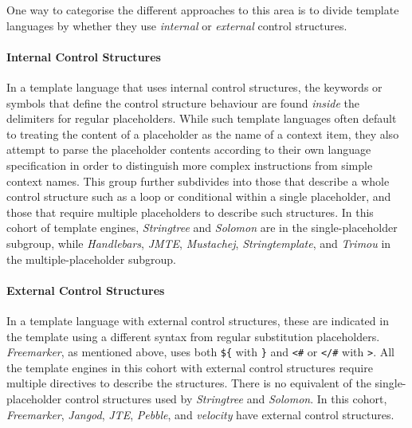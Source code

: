 One way to categorise the different approaches to this area is to divide \gls{template language}s by whether they use \emph{internal} or \emph{external} control structures.

\label{A179}
\paragraph{Internal Control Structures} In a \gls{template language} that uses internal control structures, the keywords or symbols that define the control structure behaviour are found \emph{inside} the delimiters for regular placeholders. While such \gls{template language}s often default to treating the content of a placeholder as the name of a context item, they also attempt to parse the placeholder contents according to their own language specification in order to distinguish more complex instructions from simple context names. This group further subdivides into those that describe a whole control structure such as a loop or conditional within a single placeholder, and those that require multiple placeholders to describe such structures. In this cohort of \gls{template engine}s, \emph{Stringtree} and \emph{Solomon} are in the single-placeholder subgroup, while \emph{Handlebars}, \emph{JMTE}, \emph{Mustachej}, \emph{Stringtemplate}, and \emph{Trimou} in the multiple-placeholder subgroup.

\paragraph{External Control Structures} In a \gls{template language} with external control structures, these are indicated in the template using a different syntax from regular substitution placeholders. \emph{Freemarker}, as mentioned above, uses both \verb!${! with \verb!}! and \verb!<#! or \verb!</#! with \verb!>!. All the \gls{template engine}s in this cohort with external control structures require multiple directives to describe the structures. There is no equivalent of the single-placeholder control structures used by \emph{Stringtree} and \emph{Solomon}. In this cohort, \emph{Freemarker}, \emph{Jangod}, \emph{JTE}, \emph{Pebble}, and \emph{velocity} have external control structures.

